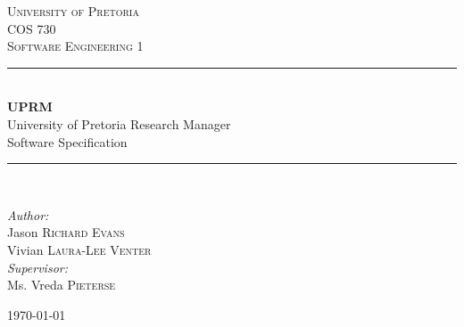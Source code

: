 \documentclass[12pt]{article}
\begin{document}
	\begin{titlepage}
		\newcommand{\HRule}{\rule{\linewidth}{0.5mm}}
		\center
		
		\textsc{\LARGE University of Pretoria}\\[1.5cm]
		\textsc{\Large COS 730}\\[0.5cm]
		\textsc{\large Software Engineering 1}\\[0.5cm]

		\HRule \\[0.4cm]
		{ \huge \bfseries UPRM}\\[0.4cm]
		{\large University of Pretoria Research Manager}\\
		{Software Specification}\\
		\HRule \\[1.5cm]
		
		\begin{minipage}{0.6\textwidth}
			\begin{flushleft} \large
				\emph{Author:}\\
				Jason \textsc{Richard Evans}\\
				Vivian \textsc{Laura-Lee Venter} \\[1cm]
				\emph{Supervisor:} \\
				Ms. Vreda \textsc{Pieterse}\\
			\end{flushleft}
		\end{minipage}
		
		\vfill
		{\large \today}\\[6cm]
		\vfill	
	\end{titlepage}
\end{document}
